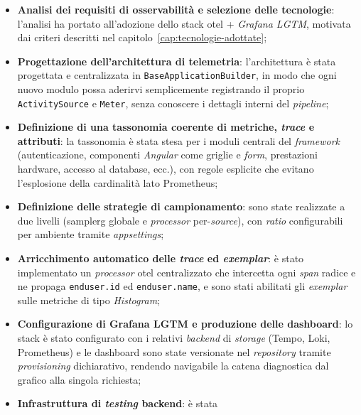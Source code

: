 \begin{itemize}
      \item \textbf{Analisi dei requisiti di osservabilità e selezione
                  delle tecnologie}: l'analisi ha portato all'adozione dello stack
            \gls{otel} + \emph{Grafana LGTM}, motivata dai criteri descritti nel
            capitolo~\ref{cap:tecnologie-adottate};
      \item \textbf{Progettazione dell'architettura di telemetria}:
            l'architettura è stata progettata e centralizzata in
            \texttt{BaseApplicationBuilder}, in modo che ogni nuovo modulo possa
            aderirvi semplicemente registrando il proprio \texttt{ActivitySource} e
            \texttt{Meter}, senza conoscere i dettagli interni del
            \emph{pipeline};
      \item \textbf{Definizione di una tassonomia coerente di metriche,
                  \emph{trace} e attributi}: la tassonomia è stata stesa per i moduli
            centrali del \emph{framework} (autenticazione, componenti
            \emph{Angular} come griglie e \emph{form}, prestazioni hardware,
            accesso al database, ecc.), con regole esplicite che evitano l'esplosione
            della cardinalità lato Prometheus;
      \item \textbf{Definizione delle strategie di campionamento}: sono
            state realizzate a due livelli (\gls{samplerg} globale e
            \emph{processor} per-\emph{source}), con \emph{ratio} configurabili per
            ambiente tramite \emph{appsettings};
      \item \textbf{Arricchimento automatico delle \emph{trace} ed
                  \emph{exemplar}}: è stato implementato un \emph{processor} \gls{otel}
            centralizzato che intercetta ogni \emph{span} radice e ne propaga
            \texttt{enduser.id} ed \texttt{enduser.name}, e sono stati abilitati
            gli \emph{exemplar} sulle metriche di tipo \emph{Histogram};
      \item \textbf{Configurazione di Grafana LGTM e produzione delle
                  dashboard}: lo stack è stato configurato con i relativi \emph{backend}
            di \emph{storage} (Tempo, Loki, Prometheus) e le dashboard sono state
            versionate nel \emph{repository} tramite \emph{provisioning}
            dichiarativo, rendendo navigabile la catena diagnostica dal grafico
            alla singola richiesta;
      \item \textbf{Infrastruttura di \emph{testing} backend}: è stata

\end{itemize}

